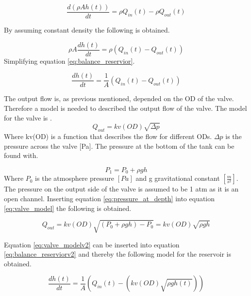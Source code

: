 \begin{equation}
		\frac{d(\rho Ah(t))}{dt}=\rho Q_{in}(t)-\rho Q_{out}(t)
\end{equation}

By assuming constant density the following is obtained.

\begin{equation}\label{eq:balance_reservior}
	\rho A\frac{dh(t)}{dt}=\rho \left(Q_{in}(t)-Q_{out}(t)\right)
\end{equation}
Simplifying equation \ref{eq:balance_reservior}.

\begin{equation}\label{eq:balance_reserviorv2}
	\frac{dh(t)}{dt}=\frac{1}{A} \left(Q_{in}(t)-Q_{out}(t)\right)
\end{equation}

The output flow is, as previous mentioned, depended on the OD of the valve. Therefore a model is needed to described the output flow of the valve. The model for the valve is \cite{boysen}.
\begin{equation}\label{eq:valve_model}
	Q_{out} = kv(OD) \sqrt{\Delta p}
\end{equation}
Where kv(OD) is a function that describes the flow for different ODs. $\Delta p$ is the pressure across the valve [Pa]. The pressure at the bottom of the tank can be found with.

\begin{equation}\label{eq:pressure_at_depth}
 	P_1 = P_0 +\rho g h
 \end{equation} 
 Where $P_0$ is the atmosphere pressure $[Pa]$ and g gravitational constant $\left[\frac{m}{s^2}\right]$. The pressure on the output side of the valve is assumed to be 1 atm as it is an open channel. Inserting equation \ref{eq:pressure_at_depth} into equation \ref{eq:valve_model} the following is obtained.    


\begin{equation}\label{eq:valve_modelv2}
	Q_{out} = kv(OD) \sqrt{(P_0 +\rho g h)- P_0} = kv(OD) \sqrt{\rho g h} 
\end{equation}

Equation \ref{eq:valve_modelv2} can be inserted into equation \ref{eq:balance_reserviorv2} and thereby the following model for the reservoir is obtained.

\begin{equation}\label{eq:balance_reserviorv3}
	\frac{dh(t)}{dt}=\frac{1}{A} \left(Q_{in}(t)-\left(kv(OD) \sqrt{\rho g h(t)}\right)\right)
\end{equation}
